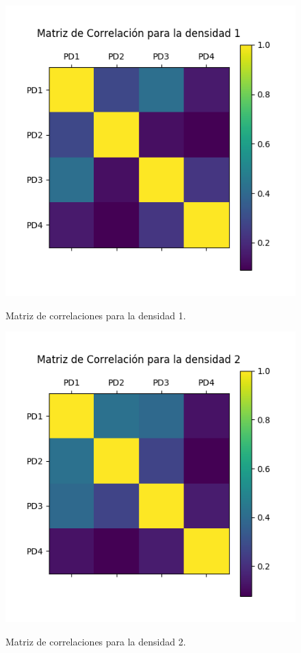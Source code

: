 \begin{figure}[h!]
	\caption{Matriz de correlaciones para la densidad 1.}
	\centering
	\includegraphics[scale=0.5]{correlacionD1.jpg}
	\label{fig:cd1}
\end{figure}

\begin{figure}[h!]
	\caption{Matriz de correlaciones para la densidad 2.}
	\centering
	\includegraphics[scale=0.5]{correlacionD2.jpg}
	\label{fig:cd2}
\end{figure}

